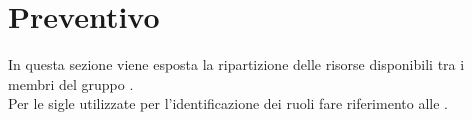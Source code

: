 \section{Preventivo}
In questa sezione viene esposta la ripartizione delle risorse disponibili tra i membri del gruppo \Gruppo{}. \\ Per le sigle utilizzate per l'identificazione dei ruoli fare riferimento alle .




